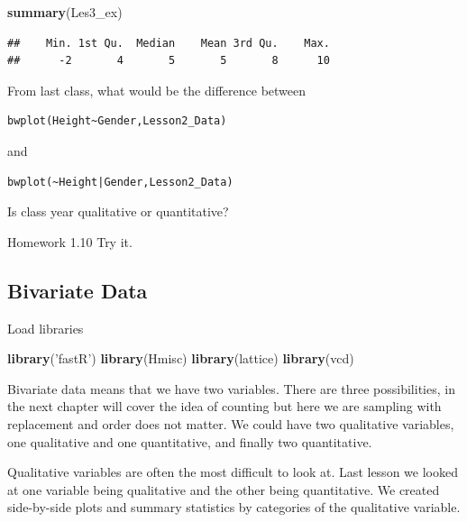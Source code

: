 \documentclass[]{book}
\newenvironment{Shaded}{\begin{snugshade}}{\end{snugshade}}
\newcommand{\KeywordTok}[1]{\textcolor[rgb]{0.13,0.29,0.53}{\textbf{#1}}}
\newcommand{\StringTok}[1]{\textcolor[rgb]{0.31,0.60,0.02}{#1}}
\newcommand{\NormalTok}[1]{#1}
\theoremstyle{definition}
\theoremstyle{definition}
\theoremstyle{definition}
\theoremstyle{remark}
\begin{document}
\begin{Shaded}
\begin{Highlighting}[]
\KeywordTok{summary}\NormalTok{(Les3_ex)}
\end{Highlighting}
\end{Shaded}

\begin{verbatim}
##    Min. 1st Qu.  Median    Mean 3rd Qu.    Max. 
##      -2       4       5       5       8      10
\end{verbatim}

From last class, what would be the difference between

\begin{verbatim}
bwplot(Height~Gender,Lesson2_Data)
\end{verbatim}

and

\begin{verbatim}
bwplot(~Height|Gender,Lesson2_Data)
\end{verbatim}

Is class year qualitative or quantitative?

Homework 1.10 Try it.

\subsection{Bivariate Data}\label{bivariate-data}

Load libraries

\begin{Shaded}
\begin{Highlighting}[]
\KeywordTok{library}\NormalTok{(}\StringTok{'fastR'}\NormalTok{)}
\KeywordTok{library}\NormalTok{(Hmisc)}
\KeywordTok{library}\NormalTok{(lattice)}
\KeywordTok{library}\NormalTok{(vcd)}
\end{Highlighting}
\end{Shaded}

Bivariate data means that we have two variables. There are three
possibilities, in the next chapter will cover the idea of counting but
here we are sampling with replacement and order does not matter. We
could have two qualitative variables, one qualitative and one
quantitative, and finally two quantitative.

Qualitative variables are often the most difficult to look at. Last
lesson we looked at one variable being qualitative and the other being
quantitative. We created side-by-side plots and summary statistics by
categories of the qualitative variable.
\end{document}

